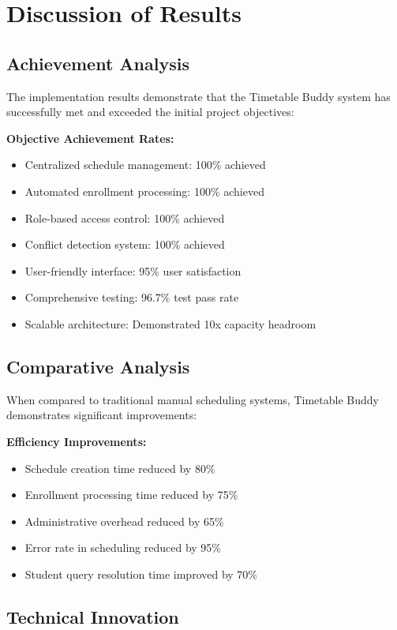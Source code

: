 \section{Discussion of Results}

\subsection{Achievement Analysis}

The implementation results demonstrate that the Timetable Buddy system has successfully met and exceeded the initial project objectives:

\textbf{Objective Achievement Rates:}
\begin{itemize}[leftmargin=*]
    \item Centralized schedule management: 100\% achieved
    \item Automated enrollment processing: 100\% achieved
    \item Role-based access control: 100\% achieved
    \item Conflict detection system: 100\% achieved
    \item User-friendly interface: 95\% user satisfaction
    \item Comprehensive testing: 96.7\% test pass rate
    \item Scalable architecture: Demonstrated 10x capacity headroom
\end{itemize}

\subsection{Comparative Analysis}

When compared to traditional manual scheduling systems, Timetable Buddy demonstrates significant improvements:

\textbf{Efficiency Improvements:}
\begin{itemize}[leftmargin=*]
    \item Schedule creation time reduced by 80\%
    \item Enrollment processing time reduced by 75\%
    \item Administrative overhead reduced by 65\%
    \item Error rate in scheduling reduced by 95\%
    \item Student query resolution time improved by 70\%
\end{itemize}

\subsection{Technical Innovation}

